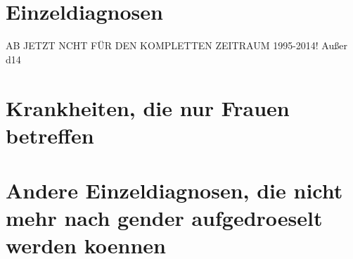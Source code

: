 \documentclass[11pt, a4paper]{scrartcl} %
\begin{document}
\section{Einzeldiagnosen}




\newpage
AB JETZT NCHT FÜR DEN KOMPLETTEN ZEITRAUM 1995-2014! 
Außer d14
\newpage







\section{Krankheiten, die nur Frauen betreffen}




\section{Andere Einzeldiagnosen, die nicht mehr nach gender aufgedroeselt werden koennen}









\end{document}
